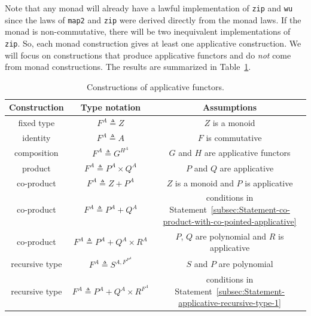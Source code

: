 Note that any monad will already have a lawful implementation of \lstinline!zip!
and \lstinline!wu! since the laws of \lstinline!map2! and \lstinline!zip!
were derived directly from the monad laws. If the monad is non-commutative,
there will be two inequivalent implementations of \lstinline!zip!.
So, each monad construction gives at least one applicative construction.
We will focus on constructions that produce applicative functors and
do \emph{not} come from monad constructions. The results are summarized
in Table~\ref{tab:Constructions-of-applicative-functors}.

\begin{table}
\begin{centering}
\begin{tabular}{|c|c|c|}
\hline 
\textbf{\small{}Construction} & \textbf{\small{}Type notation} & \textbf{\small{}Assumptions}\tabularnewline
\hline 
\hline 
{\footnotesize{}fixed type} & {\footnotesize{}$F^{A}\triangleq Z$} & {\footnotesize{}$Z$ is a monoid}\tabularnewline
\hline 
{\footnotesize{}identity} & {\footnotesize{}$F^{A}\triangleq A$} & {\footnotesize{}$F$ is commutative}\tabularnewline
\hline 
{\footnotesize{}composition} & {\footnotesize{}$F^{A}\triangleq G^{H^{A}}$} & {\footnotesize{}$G$ and $H$ are applicative functors}\tabularnewline
\hline 
{\footnotesize{}product} & {\footnotesize{}$F^{A}\triangleq P^{A}\times Q^{A}$} & {\footnotesize{}$P$ and $Q$ are applicative}\tabularnewline
\hline 
{\footnotesize{}co-product} & {\footnotesize{}$F^{A}\triangleq Z+P^{A}$} & {\footnotesize{}$Z$ is a monoid and $P$ is applicative}\tabularnewline
\hline 
{\footnotesize{}co-product} & {\footnotesize{}$F^{A}\triangleq P^{A}+Q^{A}$} & {\footnotesize{}conditions in Statement~\ref{subsec:Statement-co-product-with-co-pointed-applicative}}\tabularnewline
\hline 
{\footnotesize{}co-product} & {\footnotesize{}$F^{A}\triangleq P^{A}+Q^{A}\times R^{A}$} & {\footnotesize{}$P$, $Q$ are polynomial and $R$ is applicative}\tabularnewline
\hline 
{\footnotesize{}recursive type} & {\footnotesize{}$F^{A}\triangleq S^{A,F^{P^{A}}}$} & {\footnotesize{}$S$ and $P$ are polynomial}\tabularnewline
\hline 
{\footnotesize{}recursive type} & {\footnotesize{}$F^{A}\triangleq P^{A}+Q^{A}\times R^{F^{A}}$} & {\footnotesize{}conditions in Statement~\ref{subsec:Statement-applicative-recursive-type-1}}\tabularnewline
\hline 
\end{tabular}
\par\end{centering}
\caption{Constructions of applicative functors.\label{tab:Constructions-of-applicative-functors}}
\end{table}


